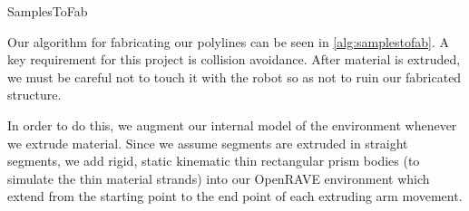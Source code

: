 \documentclass[conference]{acmsiggraph}
\makeatletter
\def\BState{\State\hskip-\ALG@thistlm}
\makeatother
\begin{document}
\begin{algorithm}
\caption{SamplesToFab}\label{alg:samplestofab}
\end{algorithm}


Our algorithm for fabricating our polylines can be seen in \ref{alg:samplestofab}.  A key requirement for this project is collision avoidance.  After material is extruded, we must be careful not to touch it with the robot so as not to ruin our fabricated structure.

In order to do this, we augment our internal model of the environment whenever we extrude material.  Since we assume segments are extruded in straight segments, we add rigid, static kinematic thin rectangular prism bodies (to simulate the thin material strands) into our OpenRAVE environment which extend from the starting point to the end point of each extruding arm movement.
\end{document}
